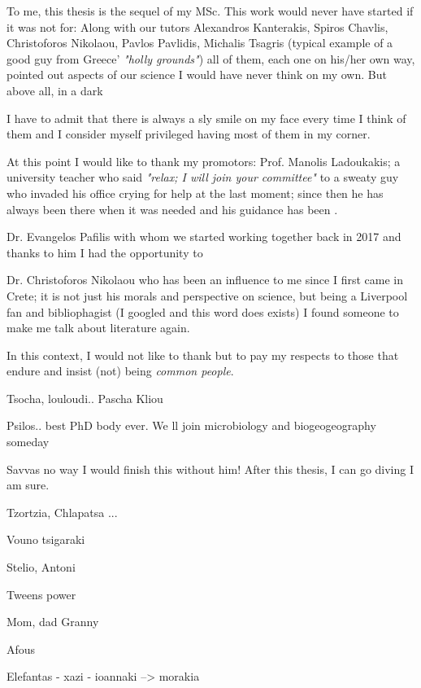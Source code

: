 \documentclass[master=elt, cleveref, autoref, masteroption=eg]{kulemt}
\begin{document}
\begin{preface}
   To me, this thesis is the sequel of my MSc. 
   This work would never have started if it was not for:
   Along with our tutors Alexandros Kanterakis, Spiros Chavlis, 
   Christoforos Nikolaou, 
   Pavlos Pavlidis, 
   Michalis Tsagris (typical example of a 
   good guy from Greece' \textit{"holly grounds"}) 
   all of them, each one on his/her own way, pointed out aspects of our science I would have never think on my own. 
   But above all, in a dark 

   I have to admit that there is always a sly smile on my face every time I think of them 
   and I consider myself privileged having most of them in my corner. 

   At this point I would like to thank my promotors: 
   Prof. Manolis Ladoukakis; a university teacher who said \textit{"relax; I will join your committee"} 
   to a sweaty guy who invaded his office crying for help at the last moment; 
   since then he has always been there when it was needed and his guidance has been . 

   Dr. Evangelos Pafilis with whom we started working together back in 2017 
   and thanks to him I had the opportunity to

   Dr. Christoforos Nikolaou who has been an influence to me since I first came in Crete; 
   it is not just his morals and perspective on science, but being a Liverpool fan and bibliophagist 
   (I googled and this word does exists)
   I found someone to make me talk about literature again. 



   In this context, I would not like to thank but to pay my respects to those that endure 
   and insist (not) being \textit{common people}.

   Tsocha, louloudi.. 
   Pascha 
   Kliou 
  

   Psilos.. best PhD body ever. We ll join microbiology and biogeogeography someday 

   Savvas no way I would finish this without him! After this thesis, I can go diving I am sure. 
   
   Tzortzia, Chlapatsa ... 

   Vouno tsigaraki 

   Stelio, Antoni

   Tweens power 

   Mom, dad 
   Granny 


   Afous 


   Elefantas - xazi - ioannaki --> morakia  
  
\end{preface}
\end{document}
